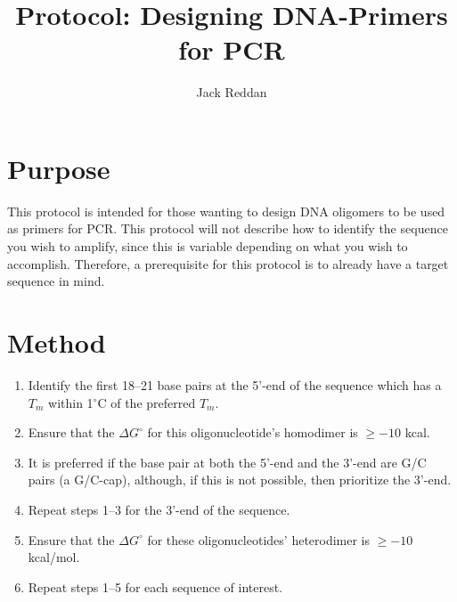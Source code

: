 \documentclass[twocolumn]{article}
\begin{document}
\title{\vspace{-2cm}Protocol: Designing DNA-Primers for PCR}
\author{Jack Reddan}

\maketitle{}


\section{Purpose}
This protocol is intended for those wanting to design DNA oligomers to be used as primers for PCR.
This protocol will not describe how to identify the sequence you wish to amplify,
since this is variable depending on what you wish to accomplish.
Therefore, a prerequisite for this protocol is to already have a target sequence in mind.

\section{Method}
\begin{enumerate}
	\item Identify the first 18--21 base pairs at the 5'-end of the sequence which has a $T_m$ within 1$^\circ$C of the preferred $T_m$.
	\item Ensure that the $\Delta G^\circ$ for this oligonucleotide's homodimer is $\ge -10$ kcal.
	\item It is preferred if the base pair at both the 5'-end and the 3'-end are G/C pairs (a G/C-cap), although, if this is not possible, then prioritize the 3'-end.
	\item Repeat steps 1--3 for the 3'-end of the sequence.
	\item Ensure that the $\Delta G^\circ$ for these oligonucleotides' heterodimer is $\ge -10$ kcal/mol.
	\item Repeat steps 1--5 for each sequence of interest.
\end{enumerate}
\end{document}
